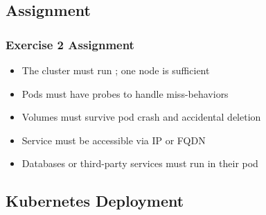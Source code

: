 \documentclass[xcolor=table,fontsize=10pt]{beamer}
\begin{document}
\subsection{Assignment}

\begin{frame}
	
	\frametitle{Exercise 2 Assignment}

		\begin{itemize}

			\item The cluster must run 
				\hspace{-0.4cm}
				; one node is sufficient
			\item Pods must have probes to handle miss-behaviors 
			\item Volumes must survive pod crash and accidental deletion
			\item Service must be accessible via IP or FQDN 
			\item Databases or third-party services must run in their pod

	\end{itemize}

\end{frame}
\subsection{Kubernetes Deployment}
\end{document}
